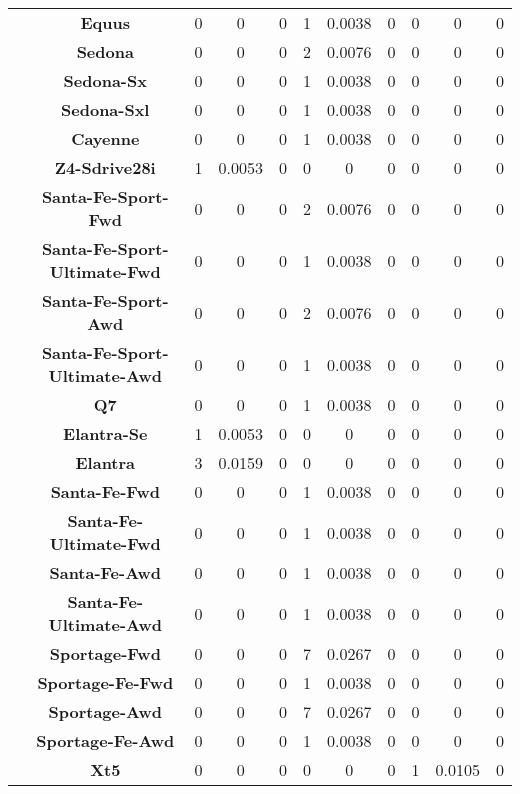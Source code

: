 \begin{center}
\begin{tabular}{|c|c||@{\hspace{1ex}}||c|c|c||@{\hspace{1ex}}||c|c|c||@{\hspace{1ex}}||c|c|c||@{\hspace{1ex}}||}
\cline{2-11}
  & {\bf Equus} & 0 & 0 & 0 & 1 & 0.0038 & 0 & 0 & 0 & 0 \\
\cline{2-11}
  & {\bf Sedona} & 0 & 0 & 0 & 2 & 0.0076 & 0 & 0 & 0 & 0 \\
\cline{2-11}
  & {\bf Sedona-Sx} & 0 & 0 & 0 & 1 & 0.0038 & 0 & 0 & 0 & 0 \\
\cline{2-11}
  & {\bf Sedona-Sxl} & 0 & 0 & 0 & 1 & 0.0038 & 0 & 0 & 0 & 0 \\
\cline{2-11}
  & {\bf Cayenne} & 0 & 0 & 0 & 1 & 0.0038 & 0 & 0 & 0 & 0 \\
\cline{2-11}
  & {\bf Z4-Sdrive28i} & 1 & 0.0053 & 0 & 0 & 0 & 0 & 0 & 0 & 0 \\
\cline{2-11}
  & {\bf Santa-Fe-Sport-Fwd} & 0 & 0 & 0 & 2 & 0.0076 & 0 & 0 & 0 & 0 \\
\cline{2-11}
  & {\bf Santa-Fe-Sport-Ultimate-Fwd} & 0 & 0 & 0 & 1 & 0.0038 & 0 & 0 & 0 & 0 \\
\cline{2-11}
  & {\bf Santa-Fe-Sport-Awd} & 0 & 0 & 0 & 2 & 0.0076 & 0 & 0 & 0 & 0 \\
\cline{2-11}
  & {\bf Santa-Fe-Sport-Ultimate-Awd} & 0 & 0 & 0 & 1 & 0.0038 & 0 & 0 & 0 & 0 \\
\cline{2-11}
  & {\bf Q7} & 0 & 0 & 0 & 1 & 0.0038 & 0 & 0 & 0 & 0 \\
\cline{2-11}
  & {\bf Elantra-Se} & 1 & 0.0053 & 0 & 0 & 0 & 0 & 0 & 0 & 0 \\
\cline{2-11}
  & {\bf Elantra} & 3 & 0.0159 & 0 & 0 & 0 & 0 & 0 & 0 & 0 \\
\cline{2-11}
  & {\bf Santa-Fe-Fwd} & 0 & 0 & 0 & 1 & 0.0038 & 0 & 0 & 0 & 0 \\
\cline{2-11}
  & {\bf Santa-Fe-Ultimate-Fwd} & 0 & 0 & 0 & 1 & 0.0038 & 0 & 0 & 0 & 0 \\
\cline{2-11}
  & {\bf Santa-Fe-Awd} & 0 & 0 & 0 & 1 & 0.0038 & 0 & 0 & 0 & 0 \\
\cline{2-11}
  & {\bf Santa-Fe-Ultimate-Awd} & 0 & 0 & 0 & 1 & 0.0038 & 0 & 0 & 0 & 0 \\
\cline{2-11}
  & {\bf Sportage-Fwd} & 0 & 0 & 0 & 7 & 0.0267 & 0 & 0 & 0 & 0 \\
\cline{2-11}
  & {\bf Sportage-Fe-Fwd} & 0 & 0 & 0 & 1 & 0.0038 & 0 & 0 & 0 & 0 \\
\cline{2-11}
  & {\bf Sportage-Awd} & 0 & 0 & 0 & 7 & 0.0267 & 0 & 0 & 0 & 0 \\
\cline{2-11}
  & {\bf Sportage-Fe-Awd} & 0 & 0 & 0 & 1 & 0.0038 & 0 & 0 & 0 & 0 \\
\cline{2-11}
  & {\bf Xt5} & 0 & 0 & 0 & 0 & 0 & 0 & 1 & 0.0105 & 0 \\

\end{tabular}
\end{center}
